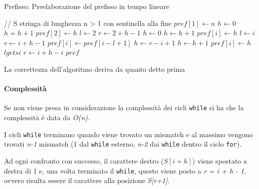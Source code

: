\begin{breakablealgorithm}
	\caption{Prefisso: Preelaborazione del prefisso in tempo lineare}
	\begin{algorithmic}[1]
		    \State // S stringa di lunghezza n > 1 con sentinella alla fine
		    \State $ pref[1] \gets n $  
		    \State $ h \gets 0 $
		        \State $ h = h +1 $
		    \EndWhile
		    \State $ pref[2] \gets h $
		    \State  $ l \gets 2 $
		    \State $ r \gets 2 + h - 1$
			     
			        \State $ h \gets 0$
		                \State $ h \gets h + 1 $
		            \EndWhile
		            \State $ pref[i] \gets h$
		            \State $ l \gets i $
		            \State $ r \gets i + h -1 $
		        \Else {}
				     
		                \State $pref[i] \gets pref[i - l +1]$
		            \Else {}
		               \State $h \gets r - i +1$
		                    \State $ h \gets h +1 $
		                \EndWhile
		                \State $pref[i] \gets h$
		                \State $l gets i$
		                \State $ r \gets i +h -i$
			         \EndIf
		          \EndIf
		    \EndFor
		    \State \Return $ pref $
		   \EndFunction
	\end{algorithmic}
\end{breakablealgorithm}

La correttezza dell'algoritmo deriva da quanto detto prima

\paragraph{Complessità}\label{complessituxe0}

Se non viene presa in considerazione la complessità dei cicli
\texttt{while} si ha che la complessità è data da \emph{O(n)}.

I cicli \texttt{while} terminano quando viene trovato un mismatch e al
massimo vengono trovati \emph{n-1} mismatch (1 dal \texttt{while}
esterno, \textit{n-2} dai \texttt{while} dentro il ciclo \texttt{for}).

Ad ogni confronto con successo, il carattere destro ($S[i+h]$)
viene spostato a destra di 1 e, una volta terminato il \texttt{while}, questo viene posto a \textit{r = i + h - 1}, ovvero risulta essere il carattere alla posizione \textit{S[r+1]}.

